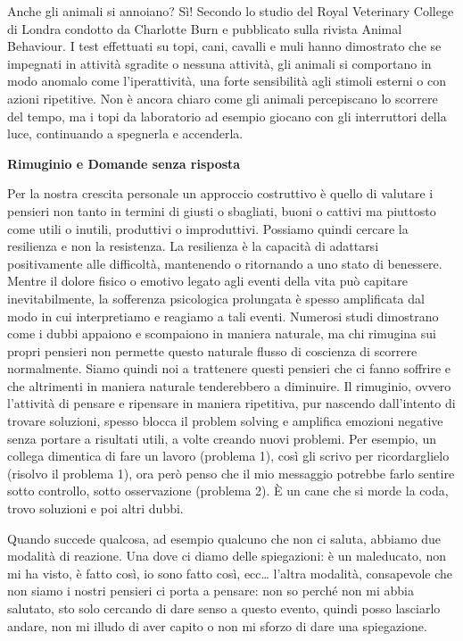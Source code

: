 \documentclass[12pt]{book} %
\begin{document}
\begin{mdframed}[linewidth=1pt]
Anche gli animali si annoiano? Sì! Secondo lo studio del Royal Veterinary College di Londra condotto da Charlotte Burn e
pubblicato sulla rivista Animal Behaviour. I test effettuati su topi, cani, cavalli e muli hanno dimostrato che se
impegnati in attività sgradite o nessuna attività, gli animali si comportano in modo anomalo come l'iperattività, una
forte sensibilità agli stimoli esterni o con azioni ripetitive. Non è ancora chiaro come gli animali percepiscano lo
scorrere del tempo, ma i topi da laboratorio ad esempio giocano con gli interruttori della luce, continuando a
spegnerla e accenderla. 
\end{mdframed}


\textbf{Rimuginio e Domande senza risposta}

Per la nostra crescita personale un approccio costruttivo è quello di valutare i pensieri non tanto in termini di giusti o sbagliati, buoni o cattivi ma piuttosto come utili o inutili, produttivi o improduttivi. Possiamo quindi cercare la resilienza e non la resistenza. La resilienza è la capacità di adattarsi positivamente alle difficoltà, mantenendo o ritornando a uno stato di benessere. Mentre il dolore fisico o emotivo legato agli eventi della vita può capitare inevitabilmente, la sofferenza psicologica prolungata è spesso amplificata dal modo in cui interpretiamo e reagiamo a tali eventi. 
Numerosi studi dimostrano come i
dubbi appaiono e scompaiono in maniera naturale, ma chi rimugina sui propri pensieri non permette questo naturale
flusso di coscienza di scorrere normalmente. Siamo quindi noi a trattenere questi pensieri che ci fanno soffrire e
che altrimenti in maniera naturale tenderebbero a diminuire. Il rimuginio, ovvero l'attività di pensare e
ripensare in maniera ripetitiva, pur nascendo dall’intento di trovare soluzioni, spesso blocca il problem solving e amplifica emozioni negative senza portare a risultati utili, a volte creando nuovi problemi. Per esempio, un collega dimentica di fare un lavoro (problema 1), così gli scrivo per
ricordarglielo (risolvo il problema 1), ora però penso che il mio messaggio potrebbe farlo sentire sotto controllo,
sotto osservazione (problema 2). È un cane che si morde la coda, trovo soluzioni e poi altri dubbi.

Quando succede qualcosa, ad esempio qualcuno che non ci saluta, abbiamo due modalità di reazione. Una dove ci diamo delle spiegazioni: è un maleducato, non mi ha visto, è fatto così, io sono fatto così, ecc… l'altra modalità, consapevole che non siamo i nostri pensieri ci porta a pensare: non so perché non mi abbia salutato, sto solo cercando di dare senso a questo evento, quindi posso lasciarlo andare, non mi illudo di aver capito o non mi sforzo di dare una spiegazione.
\end{document}
